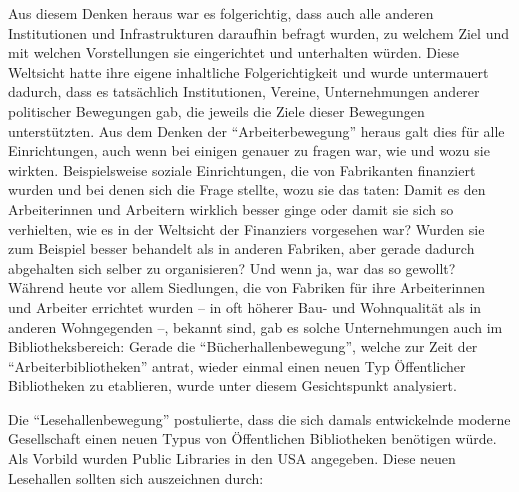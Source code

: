 \documentclass[a4paper,
fontsize=11pt,
oneside,
numbers=noperiodatend,
parskip=half-,
bibliography=totoc,
final
]{scrartcl}
\begin{document}
Aus diesem Denken heraus war es folgerichtig, dass auch alle anderen
Institutionen und Infrastrukturen daraufhin befragt wurden, zu welchem
Ziel und mit welchen Vorstellungen sie eingerichtet und unterhalten
würden. Diese Weltsicht hatte ihre eigene inhaltliche Folgerichtigkeit
und wurde untermauert dadurch, dass es tatsächlich Institutionen,
Vereine, Unternehmungen anderer politischer Bewegungen gab, die jeweils
die Ziele dieser Bewegungen unterstützten. Aus dem Denken der
\enquote{Arbeiterbewegung} heraus galt dies für alle Einrichtungen, auch
wenn bei einigen genauer zu fragen war, wie und wozu sie wirkten.
Beispielsweise soziale Einrichtungen, die von Fabrikanten finanziert
wurden und bei denen sich die Frage stellte, wozu sie das taten: Damit
es den Arbeiterinnen und Arbeitern wirklich besser ginge oder damit sie
sich so verhielten, wie es in der Weltsicht der Finanziers vorgesehen
war? Wurden sie zum Beispiel besser behandelt als in anderen Fabriken,
aber gerade dadurch abgehalten sich selber zu organisieren? Und wenn ja,
war das so gewollt? Während heute vor allem Siedlungen, die von Fabriken
für ihre Arbeiterinnen und Arbeiter errichtet wurden -- in oft höherer
Bau- und Wohnqualität als in anderen Wohngegenden --, bekannt sind, gab
es solche Unternehmungen auch im Bibliotheksbereich: Gerade die
\enquote{Bücherhallenbewegung}, welche zur Zeit der
\enquote{Arbeiterbibliotheken} antrat, wieder einmal einen neuen Typ
Öffentlicher Bibliotheken zu etablieren, wurde unter diesem
Gesichtspunkt analysiert.

Die \enquote{Lesehallenbewegung} postulierte, dass die sich damals
entwickelnde moderne Gesellschaft einen neuen Typus von Öffentlichen
Bibliotheken benötigen würde. Als Vorbild wurden Public Libraries in den
USA angegeben. Diese neuen Lesehallen sollten sich auszeichnen durch:
\end{document}
